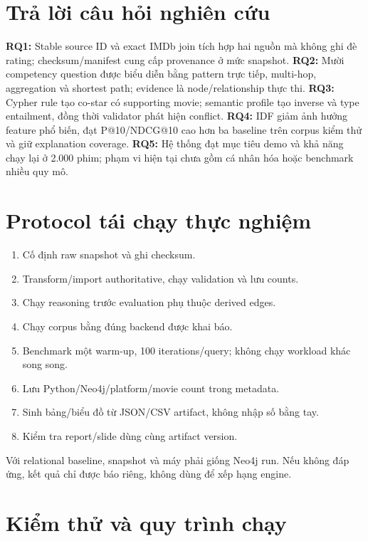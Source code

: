 \section{Trả lời câu hỏi nghiên cứu}

\textbf{RQ1:} Stable source ID và exact IMDb join tích hợp hai nguồn mà không ghi đè
rating; checksum/manifest cung cấp provenance ở mức snapshot.
\textbf{RQ2:} Mười competency question được biểu diễn bằng pattern trực tiếp, multi-hop,
aggregation và shortest path; evidence là node/relationship thực thi.
\textbf{RQ3:} Cypher rule tạo co-star có supporting movie; semantic profile tạo inverse
và type entailment, đồng thời validator phát hiện conflict.
\textbf{RQ4:} IDF giảm ảnh hưởng feature phổ biến, đạt P@10/NDCG@10 cao hơn ba baseline
trên corpus kiểm thử và giữ explanation coverage.
\textbf{RQ5:} Hệ thống đạt mục tiêu demo và khả năng chạy lại ở 2.000 phim; phạm vi
hiện tại chưa gồm cá nhân hóa hoặc benchmark nhiều quy mô.

\section{Protocol tái chạy thực nghiệm}

\begin{enumerate}
\item Cố định raw snapshot và ghi checksum.
\item Transform/import authoritative, chạy validation và lưu counts.
\item Chạy reasoning trước evaluation phụ thuộc derived edges.
\item Chạy corpus bằng đúng backend được khai báo.
\item Benchmark một warm-up, 100 iterations/query; không chạy workload khác song song.
\item Lưu Python/Neo4j/platform/movie count trong metadata.
\item Sinh bảng/biểu đồ từ JSON/CSV artifact, không nhập số bằng tay.
\item Kiểm tra report/slide dùng cùng artifact version.
\end{enumerate}

Với relational baseline, snapshot và máy phải giống Neo4j run. Nếu không đáp ứng,
kết quả chỉ được báo riêng, không dùng để xếp hạng engine.

\section{Kiểm thử và quy trình chạy}

